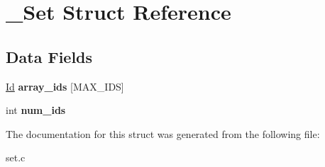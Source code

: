 \hypertarget{struct__Set}{}\section{\+\_\+\+Set Struct Reference}
\label{struct__Set}
\subsection*{Data Fields}
\begin{DoxyCompactItemize}
\item 
\mbox{\label{struct__Set_a8bd2eb5672056a1c352aaeeabbf58661}} 
\hyperlink{types_8h_a845e604fb28f7e3d97549da3448149d3}{Id} {\bfseries array\+\_\+ids} \mbox{[}M\+A\+X\+\_\+\+I\+DS\mbox{]}
\item 
\mbox{\label{struct__Set_a0165e806ff2b4de3ec7dd0991a54a677}} 
int {\bfseries num\+\_\+ids}
\end{DoxyCompactItemize}


The documentation for this struct was generated from the following file\+:\begin{DoxyCompactItemize}
\item 
set.\+c\end{DoxyCompactItemize}
